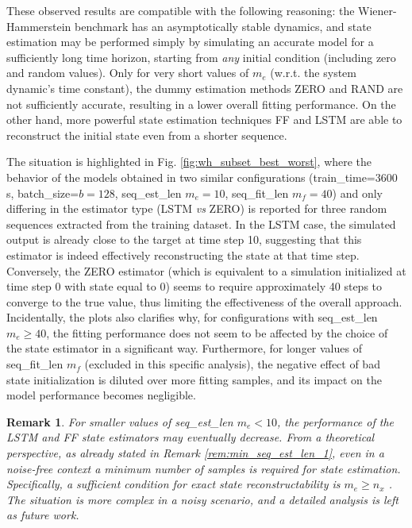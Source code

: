 \documentclass{article}
\newcommand{\batchsize}{b}
\newcommand{\seqlen}{m}
\newcommand{\nx}{{n_x}}
\newtheorem{remark}{Remark}
\begin{document}
These observed results are compatible with the following reasoning: the Wiener-Hammerstein benchmark has an asymptotically stable dynamics, and state estimation may be performed simply by simulating an accurate model for a sufficiently long time horizon, starting from \emph{any} initial condition (including zero and random values).
Only for very short values of $\seqlen_e$ (w.r.t. the system dynamic's time constant), the dummy
estimation methods ZERO and RAND are not sufficiently accurate, resulting in a lower overall fitting performance. On the other hand,  more powerful state estimation techniques FF and LSTM are able to reconstruct the initial state even from a shorter sequence.

The situation is highlighted in Fig. \ref{fig:wh_subset_best_worst}, where the behavior of the models obtained in two similar configurations 
(train\_time=3600 s, batch\_size=$\batchsize=128$, seq\_est\_len $\seqlen_e=10$, seq\_fit\_len $\seqlen_f=40$) and only differing in the estimator type (LSTM \emph{vs} ZERO) is reported for three random sequences extracted from the training dataset. In the LSTM case, the simulated output is already close to the target at time step 10, suggesting that this estimator is indeed effectively reconstructing the state at that time step. Conversely, the ZERO estimator (which is equivalent to a simulation initialized at time step 0 with state equal to 0) seems to require approximately 40 steps to converge to the true value, thus limiting the effectiveness of the overall approach. Incidentally, the plots also clarifies why, for configurations with seq\_est\_len $\seqlen_e \geq 40$, the fitting performance does not seem to
be affected by the choice of the state estimator in a significant way. Furthermore, for longer values of seq\_fit\_len $\seqlen_f$ (excluded in this specific analysis), the negative effect of bad state initialization is diluted over more fitting samples, and its impact on 
the model performance becomes negligible.

\begin{remark}%
For smaller values of seq\_est\_len $\seqlen_e < 10$, the performance of the LSTM and FF state estimators may eventually decrease.
From a theoretical perspective, as already stated in Remark 
\ref{rem:min_seq_est_len_1}, even in a noise-free context a minimum number of samples is required for state estimation.
Specifically, a sufficient condition for exact state reconstructability is $\seqlen_e \geq \nx$ \cite{verdult2004least}.
The situation is more complex in a noisy scenario, and a detailed analysis is left as future work.
\end{remark}
\end{document}
